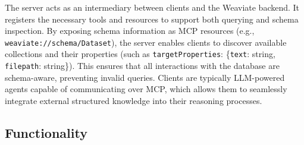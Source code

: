 The server acts as an intermediary between clients and the Weaviate backend. It registers the necessary tools and resources to support both querying and schema inspection. By exposing schema information as MCP resources (e.g., \texttt{weaviate://schema/Dataset}), the server enables clients to discover available collections and their properties (such as \texttt{targetProperties}: \{\texttt{text}: string, \texttt{filepath}: string\}). This ensures that all interactions with the database are schema-aware, preventing invalid queries. Clients are typically \ac{LLM}-powered agents capable of communicating over \ac{MCP}, which allows them to seamlessly integrate external structured knowledge into their reasoning processes.


\subsection{Functionality}
